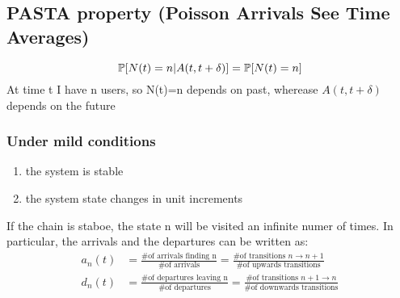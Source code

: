 \subsection{PASTA property (Poisson Arrivals See Time Averages)}
\begin{equation}
  \mathbb{P}[N(t)=n|A(t,t+\delta)] = \mathbb{P}[N(t)=n]
\end{equation}
At time t I have n users, so N(t)=n depends on past, wherease $A(t,t+\delta)$ depends on the future

\subsubsection{Under mild conditions}
\begin{enumerate}
  \item the system is stable
  \item the system state changes in unit increments
\end{enumerate}
If the chain is staboe, the state n will be visited an infinite numer of times. In particular, the arrivals and the departures can be written as:
\begin{equation}\begin{split}
a_n(t)&= \frac{\text{\# of arrivals finding n}}{\text{\# of arrivals}} = \frac{\text{\# of transitions } n \to n+1}{\text{\# of upwards transitions}}\\
d_n(t)&= \frac{\text{\# of departures leaving n}}{\text{\# of departures}} = \frac{\text{\# of transitions } n+1 \to n}{\text{\# of downwards transitions}}
\end{split}\end{equation}
